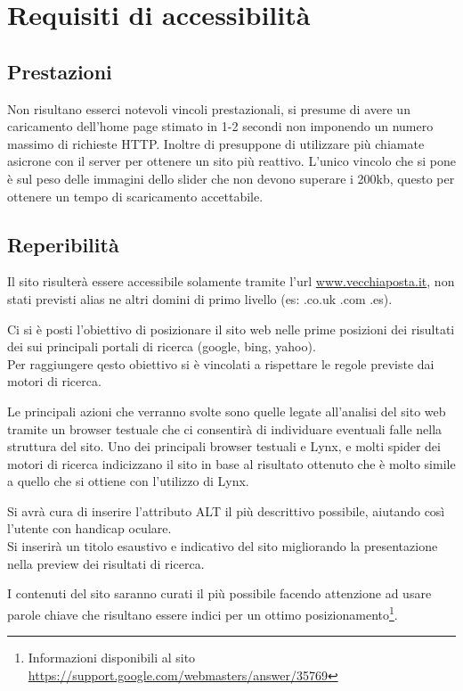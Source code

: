 \documentclass[a4paper,12pt,hidelinks]{report}
\begin{document}
\section{Requisiti di accessibilità}
  \subsection{Prestazioni}
    Non risultano esserci notevoli vincoli prestazionali, si presume di avere un caricamento dell'home page stimato in 1-2 secondi non imponendo un numero massimo di richieste HTTP.
    Inoltre di presuppone di utilizzare più chiamate asicrone con il server per ottenere un sito più reattivo. L'unico vincolo che si pone è sul peso delle immagini dello slider che
    non devono superare i 200kb, questo per ottenere un tempo di scaricamento accettabile.
  
  \subsection{Reperibilità}
    Il sito risulterà essere accessibile solamente tramite l'url \url{www.vecchiaposta.it}, non stati previsti alias ne altri domini di primo livello (es: .co.uk .com .es).
    \par Ci si è posti l'obiettivo di posizionare il sito web nelle prime posizioni dei risultati dei sui principali portali di ricerca (google, bing, yahoo).
    \\Per raggiungere qesto obiettivo si è vincolati a rispettare le regole previste dai motori di ricerca. 
    \par Le principali azioni che verranno svolte sono quelle legate all'analisi del sito web tramite un browser testuale che ci consentirà di individuare eventuali
    falle nella struttura del sito. Uno dei principali browser testuali e Lynx, e molti spider dei motori di ricerca indicizzano il sito
    in base al risultato ottenuto che è molto simile a quello che si ottiene con l'utilizzo di Lynx. 
    \par Si avrà cura di inserire l'attributo ALT il più descrittivo possibile, aiutando così l'utente con handicap oculare. 
    \\Si inserirà un titolo esaustivo e indicativo del sito migliorando la presentazione nella preview dei risultati di ricerca. 
    \par I contenuti del sito saranno curati il più possibile facendo attenzione ad usare parole chiave che risultano essere indici per 
    un ottimo posizionamento\footnote{Informazioni disponibili al sito \url{https://support.google.com/webmasters/answer/35769}}.
    
\end{document}
